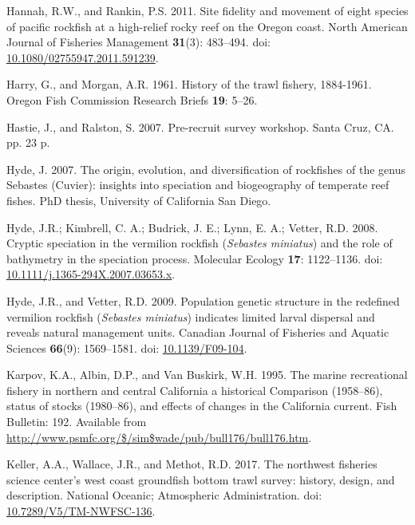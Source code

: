 \documentclass[11pt,
  english,
]{article}
\newlength{\cslhangindent}
\newenvironment{CSLReferences}[2] %
 {%
  \setlength{\parindent}{0pt}
  \ifodd #1 \everypar{\setlength{\hangindent}{\cslhangindent}}\ignorespaces\fi
  \ifnum #2 > 0
  \setlength{\parskip}{#2\baselineskip}
  \fi
 }%
 {}
\begin{document}
\begin{CSLReferences}{1}{0}
\leavevmode{}%
Hannah, R.W., and Rankin, P.S. 2011. {Site fidelity and movement of eight species of pacific rockfish at a high-relief rocky reef on the Oregon coast}. North American Journal of Fisheries Management \textbf{31}(3): 483--494. doi: \href{https://doi.org/10.1080/02755947.2011.591239}{10.1080/02755947.2011.591239}.

\leavevmode{}%
Harry, G., and Morgan, A.R. 1961. {History of the trawl fishery, 1884-1961}. Oregon Fish Commission Research Briefs \textbf{19}: 5--26.

\leavevmode{}%
Hastie, J., and Ralston, S. 2007. {Pre-recruit survey workshop}. Santa Cruz, CA. pp. 23 p.

\leavevmode{}%
Hyde, J. 2007. {The origin, evolution, and diversification of rockfishes of the genus Sebastes (Cuvier): insights into speciation and biogeography of temperate reef fishes}. PhD thesis, University of California San Diego.

\leavevmode{}%
Hyde, J.R.; Kimbrell, C. A.; Budrick, J. E.; Lynn, E. A.; Vetter, R.D. 2008. {Cryptic speciation in the vermilion rockfish (\emph{Sebastes miniatus}) and the role of bathymetry in the speciation process}. Molecular Ecology \textbf{17}: 1122--1136. doi: \href{https://doi.org/10.1111/j.1365-294X.2007.03653.x}{10.1111/j.1365-294X.2007.03653.x}.

\leavevmode{}%
Hyde, J.R., and Vetter, R.D. 2009. {Population genetic structure in the redefined vermilion rockfish (\emph{Sebastes miniatus}) indicates limited larval dispersal and reveals natural management units}. Canadian Journal of Fisheries and Aquatic Sciences \textbf{66}(9): 1569--1581. doi: \href{https://doi.org/10.1139/F09-104}{10.1139/F09-104}.

\leavevmode{}%
Karpov, K.A., Albin, D.P., and Van Buskirk, W.H. 1995. {The marine recreational fishery in northern and central California a historical Comparison (1958--86), status of stocks (1980--86), and effects of changes in the California current}. Fish Bulletin: 192. Available from \url{http://www.psmfc.org/$/sim$wade/pub/bull176/bull176.htm}.

\leavevmode{}%
Keller, A.A., Wallace, J.R., and Methot, R.D. 2017. {The northwest fisheries science center's west coast groundfish bottom trawl survey: history, design, and description}. National Oceanic; Atmospheric Administration. doi: \href{https://doi.org/10.7289/V5/TM-NWFSC-136}{10.7289/V5/TM-NWFSC-136}.


\end{CSLReferences}
\end{document}
